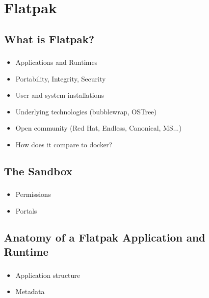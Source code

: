 %
%
%

\section{Flatpak}
\subsection{What is Flatpak?}

\begin{frame}
  \frametitle{\insertsubsection}

    \begin{itemize}
      \item Applications and Runtimes\vspacing
      \item Portability, Integrity, Security\vspacing
      \item User and system installations\vspacing
      \item Underlying technologies (bubblewrap, OSTree)\vspacing
      \item Open community (Red Hat, Endless, Canonical, MS...)\vspacing
      \item How does it compare to docker?\vspacing
    \end{itemize}
\end{frame}

\subsection{The Sandbox}
\begin{frame}
  \frametitle{\insertsubsection}

    \begin{itemize}
      \item Permissions\vspacing
      \item Portals\vspacing
    \end{itemize}
\end{frame}

\subsection{Anatomy of a Flatpak Application and Runtime}
\begin{frame}
  \frametitle{\insertsubsection}

    \begin{itemize}
      \item Application structure\vspacing
      \item Metadata\vspacing
    \end{itemize}
\end{frame}

